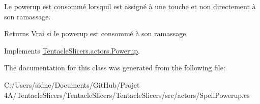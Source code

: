 Le powerup est consommé lorsqu\textquotesingle{}il est assigné à une touche et non directement à son ramassage. 

\begin{DoxyReturn}{Returns}
Vrai si le powerup est consommé à son ramassage 
\end{DoxyReturn}


Implements \hyperlink{class_tentacle_slicers_1_1actors_1_1_powerup_a31b3367e7a72d80526d92486472d329d}{Tentacle\+Slicers.\+actors.\+Powerup}.



The documentation for this class was generated from the following file\+:\begin{DoxyCompactItemize}
\item 
C\+:/\+Users/sidne/\+Documents/\+Git\+Hub/\+Projet 4\+A/\+Tentacle\+Slicers/\+Tentacle\+Slicers/\+Tentacle\+Slicers/src/actors/Spell\+Powerup.\+cs\end{DoxyCompactItemize}
